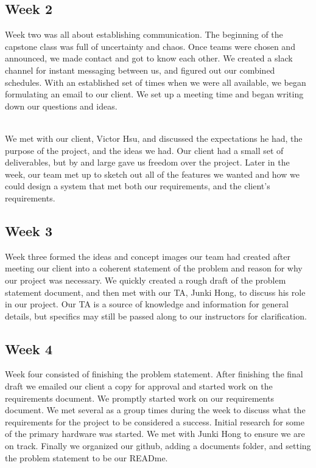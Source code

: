 \documentclass[onecolumn, draftclsnofoot,10pt, compsoc]{IEEEtran}
\begin{document}
		\subsection{Week 2}
		Week two was all about establishing communication. The beginning of the capstone class was full of uncertainty and chaos.
		Once teams were chosen and announced, we made contact and got to know each other. We created a slack channel for instant messaging between us, and figured out our combined schedules.
		With an established set of times when we were all available, we began formulating an email to our client. We set up a meeting time and began writing down our questions and ideas.

		\noindent \\We met with our client, Victor Hsu, and discussed the expectations he had, the purpose of the project, and the ideas we had.
		Our client had a small set of deliverables, but by and large gave us freedom over the project.
		Later in the week, our team met up to sketch out all of the features we wanted and how we could design a system that met both our requirements, and the client's requirements.

		\subsection{Week 3}
		Week three formed the ideas and concept images our team had created after meeting our client into a coherent statement of the problem and reason for why our project was necessary.
		We quickly created a rough draft of the problem statement document, and then met with our TA, Junki Hong, to discuss his role in our project.
		Our TA is a source of knowledge and information for general details, but specifics may still be passed along to our instructors for clarification.

		\subsection{Week 4}
		Week four consisted of finishing the problem statement. After finishing the final draft we emailed our client a copy for approval and started work on the requirements document.
		We promptly started work on our requirements document. We met several as a group times during the week to discuss what the requirements for the project  to be considered a success.
		Initial research for some of the primary hardware was started. We met with Junki Hong to ensure we are on track.
		Finally we organized our github, adding a documents folder, and setting the problem statement to be our READme.
\end{document}
